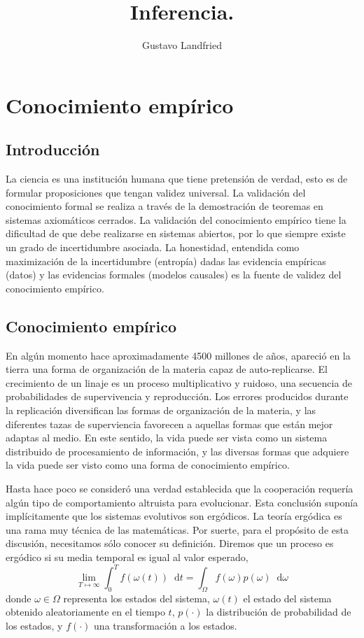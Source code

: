 \documentclass[a4paper,10pt]{book}
\title{\huge Inferencia.}
\author{Gustavo Landfried}
\newcommand*\diff{\mathop{}\!\mathrm{d}}
\begin{document}
\maketitle

\tableofcontents

\chapter{Conocimiento empírico}


\section{Introducción}

La ciencia es una institución humana que tiene pretensión de verdad, esto es de formular proposiciones que tengan validez universal.
%
La validación del conocimiento formal se realiza a través de la demostración de teoremas en sistemas axiomáticos cerrados.
%
La validación del conocimiento empírico tiene la dificultad de que debe realizarse en sistemas abiertos, por lo que siempre existe un grado de incertidumbre asociada.
%
La honestidad, entendida como maximización de la incertidumbre (entropía) dadas las evidencia empíricas (datos) y las evidencias formales (modelos causales) es la fuente de validez del conocimiento empírico.

\section{Conocimiento empírico}

En algún momento hace aproximadamente 4500 millones de años, apareció en la tierra una forma de organización de la materia capaz de auto-replicarse.
%
El crecimiento de un linaje es un proceso multiplicativo y ruidoso, una secuencia de probabilidades de supervivencia y reproducción.
%
Los errores producidos durante la replicación diversifican las formas de organización de la materia, y las diferentes tazas de superviencia favorecen a aquellas formas que están mejor adaptas al medio.
%
En este sentido, la vida puede ser vista como un sistema distribuido de procesamiento de información, y las diversas formas que adquiere la vida puede ser visto como una forma de conocimiento empírico.


Hasta hace poco se consideró una verdad establecida que la cooperación requería algún tipo de comportamiento altruista para evolucionar.
%
Esta conclusión suponía implícitamente que los sistemas evolutivos son ergódicos.
%
La teoría ergódica es una rama muy técnica de las matemáticas.
%
Por suerte, para el propósito de esta discusión, necesitamos sólo conocer su definición.
%
Diremos que un proceso es ergódico si su media temporal es igual al valor esperado,
%
\begin{equation}
 \lim_{T \mapsto \infty} \int_0^T f(\omega(t)) \diff t  = \int_{\Omega} f(\omega)p(\omega) \diff\omega
\end{equation}
%
donde $\omega \in \Omega$ representa los estados del sistema, $\omega(t)$ el estado del sistema obtenido aleatoriamente en el tiempo $t$, $p(\cdot)$ la distribución de probabilidad de los estados, y $f(\cdot)$ una transformación a los estados.
\end{document}

